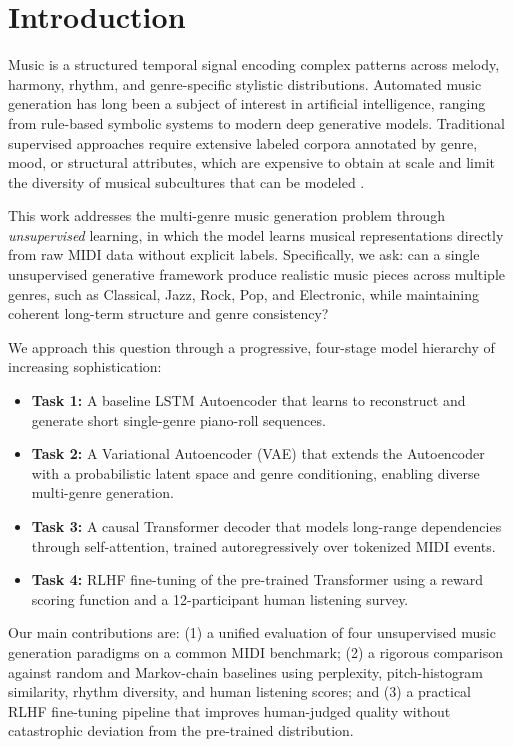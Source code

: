 \documentclass[conference]{IEEEtran}
\begin{document}
\section{Introduction}

Music is a structured temporal signal encoding complex patterns across
melody, harmony, rhythm, and genre-specific stylistic distributions.
Automated music generation has long been a subject of interest in artificial
intelligence, ranging from rule-based symbolic systems to modern deep
generative models. Traditional supervised approaches require extensive
labeled corpora annotated by genre, mood, or structural attributes, which
are expensive to obtain at scale and limit the diversity of musical
subcultures that can be modeled \cite{b1}.

This work addresses the multi-genre music generation problem through
\emph{unsupervised} learning, in which the model learns musical
representations directly from raw MIDI data without explicit labels.
Specifically, we ask: can a single unsupervised generative framework
produce realistic music pieces across multiple genres, such as Classical,
Jazz, Rock, Pop, and Electronic, while maintaining coherent long-term
structure and genre consistency?

We approach this question through a progressive, four-stage model hierarchy
of increasing sophistication:

\begin{itemize}
\item \textbf{Task 1:} A baseline LSTM Autoencoder that learns to
reconstruct and generate short single-genre piano-roll sequences.
\item \textbf{Task 2:} A Variational Autoencoder (VAE) that extends the
Autoencoder with a probabilistic latent space and genre conditioning, enabling
diverse multi-genre generation.
\item \textbf{Task 3:} A causal Transformer decoder that models long-range
dependencies through self-attention, trained autoregressively over tokenized
MIDI events.
\item \textbf{Task 4:} RLHF fine-tuning of the pre-trained Transformer
using a reward scoring function and a 12-participant human listening
survey.
\end{itemize}

Our main contributions are: (1) a unified evaluation of four unsupervised
music generation paradigms on a common MIDI benchmark; (2) a rigorous
comparison against random and Markov-chain baselines using perplexity,
pitch-histogram similarity, rhythm diversity, and human listening scores;
and (3) a practical RLHF fine-tuning pipeline that improves human-judged
quality without catastrophic deviation from the pre-trained distribution.
\end{document}
